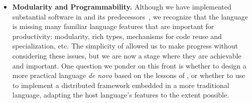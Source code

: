 \begin{itemize}
    \item {\bf Modularity and Programmability.}  Although we have implemented substantial software in \lang and its predecessors~\cite{eurosys,p2}, we recognize that the language is missing many familiar language features that are important for productivity: modularity, rich types, mechanisms for code reuse and specialization, etc.  The simplicity of \lang allowed us to make progress without considering these issues, but we are now a stage where they are achievable and important.  One question we ponder on this front is whether to design a more practical language {\em de novo} based on the lessons of \lang, or whether to use \lang to implement a distributed framework embedded in a more traditional language, adapting the host language's features to the extent possible.
    
\end{itemize}